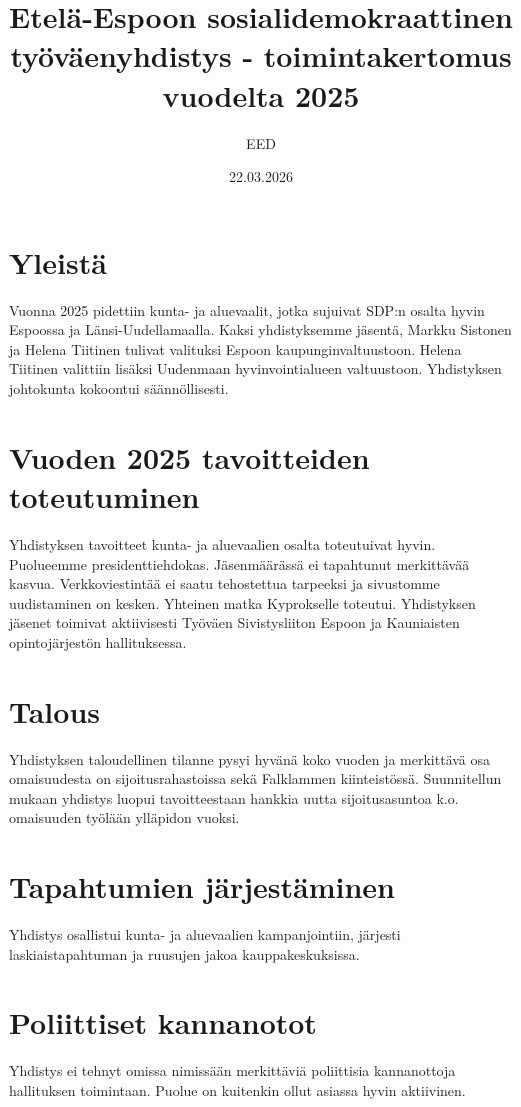 \documentclass[a4paper,12pt]{article}
\title{Etelä-Espoon sosialidemokraattinen työväenyhdistys - toimintakertomus vuodelta 2025}
\author{EED}
\date{22.03.2026}
\begin{document}
\maketitle
\section{Yleistä}
Vuonna 2025 pidettiin kunta- ja aluevaalit, jotka sujuivat SDP:n osalta hyvin Espoossa ja Länsi-Uudellamaalla. Kaksi yhdistyksemme jäsentä, Markku Sistonen ja Helena Tiitinen tulivat valituksi Espoon kaupunginvaltuustoon. Helena Tiitinen valittiin lisäksi Uudenmaan hyvinvointialueen valtuustoon. Yhdistyksen johtokunta kokoontui säännöllisesti.
\section{Vuoden 2025 tavoitteiden toteutuminen}
Yhdistyksen tavoitteet kunta- ja aluevaalien osalta toteutuivat hyvin. Puolueemme presidenttiehdokas. Jäsenmäärässä ei tapahtunut merkittävää kasvua. Verkkoviestintää ei saatu tehostettua tarpeeksi ja sivustomme uudistaminen on kesken. Yhteinen matka Kyprokselle toteutui. Yhdistyksen jäsenet toimivat aktiivisesti Työväen Sivistysliiton Espoon ja Kauniaisten opintojärjestön hallituksessa.
\section{Talous}
Yhdistyksen taloudellinen tilanne pysyi hyvänä koko vuoden ja merkittävä osa omaisuudesta on sijoitusrahastoissa sekä Falklammen kiinteistössä. Suunnitellun mukaan yhdistys luopui tavoitteestaan hankkia uutta sijoitusasuntoa k.o. omaisuuden työlään ylläpidon vuoksi.
\section{Tapahtumien järjestäminen}
Yhdistys osallistui kunta- ja aluevaalien kampanjointiin, järjesti laskiaistapahtuman ja ruusujen jakoa kauppakeskuksissa.
\section{Poliittiset kannanotot}
Yhdistys ei tehnyt omissa nimissään merkittäviä poliittisia kannanottoja hallituksen toimintaan. Puolue on kuitenkin ollut asiassa hyvin aktiivinen.
\end{document}
